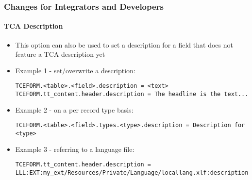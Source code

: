 \begin{frame}[fragile]
	\frametitle{Changes for Integrators and Developers}
	\framesubtitle{TCA Description}


	\begin{itemize}
		\item This option can also be used to set a description for a field
			that does not feature a TCA description yet
	\end{itemize}

	\begin{itemize}
		\item Example 1 - set/overwrite a description:
\begin{lstlisting}
TCEFORM.<table>.<field>.description = <text>
TCEFORM.tt_content.header.description = The headline is the text...
\end{lstlisting}
		\item Example 2 - on a per record type basis:
\begin{lstlisting}
TCEFORM.<table>.<field>.types.<type>.description = Description for <type>
\end{lstlisting}
		\item Example 3 - referring to a language file:
\begin{lstlisting}
TCEFORM.tt_content.header.description = LLL:EXT:my_ext/Resources/Private/Language/locallang.xlf:description
\end{lstlisting}

	\end{itemize}

\end{frame}

